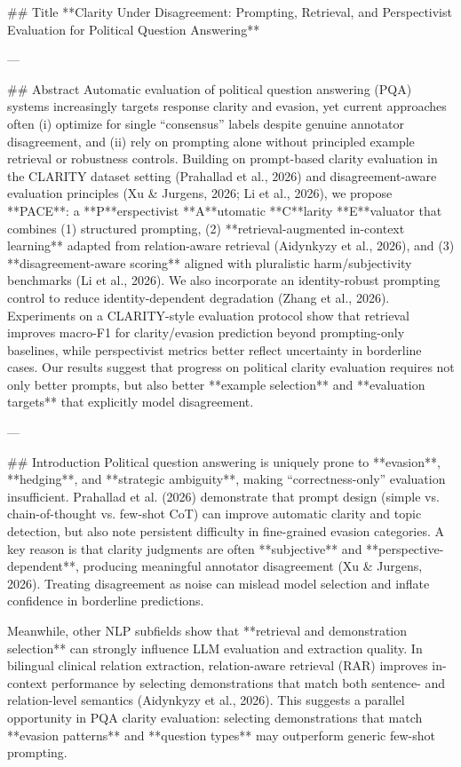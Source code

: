 ## Title  
**Clarity Under Disagreement: Prompting, Retrieval, and Perspectivist Evaluation for Political Question Answering**

---

## Abstract  
Automatic evaluation of political question answering (PQA) systems increasingly targets response clarity and evasion, yet current approaches often (i) optimize for single “consensus” labels despite genuine annotator disagreement, and (ii) rely on prompting alone without principled example retrieval or robustness controls. Building on prompt-based clarity evaluation in the CLARITY dataset setting (Prahallad et al., 2026) and disagreement-aware evaluation principles (Xu & Jurgens, 2026; Li et al., 2026), we propose **PACE**: a **P**erspectivist **A**utomatic **C**larity **E**valuator that combines (1) structured prompting, (2) **retrieval-augmented in-context learning** adapted from relation-aware retrieval (Aidynkyzy et al., 2026), and (3) **disagreement-aware scoring** aligned with pluralistic harm/subjectivity benchmarks (Li et al., 2026). We also incorporate an identity-robust prompting control to reduce identity-dependent degradation (Zhang et al., 2026). Experiments on a CLARITY-style evaluation protocol show that retrieval improves macro-F1 for clarity/evasion prediction beyond prompting-only baselines, while perspectivist metrics better reflect uncertainty in borderline cases. Our results suggest that progress on political clarity evaluation requires not only better prompts, but also better **example selection** and **evaluation targets** that explicitly model disagreement.

---

## Introduction  
Political question answering is uniquely prone to **evasion**, **hedging**, and **strategic ambiguity**, making “correctness-only” evaluation insufficient. Prahallad et al. (2026) demonstrate that prompt design (simple vs. chain-of-thought vs. few-shot CoT) can improve automatic clarity and topic detection, but also note persistent difficulty in fine-grained evasion categories. A key reason is that clarity judgments are often **subjective** and **perspective-dependent**, producing meaningful annotator disagreement (Xu & Jurgens, 2026). Treating disagreement as noise can mislead model selection and inflate confidence in borderline predictions.

Meanwhile, other NLP subfields show that **retrieval and demonstration selection** can strongly influence LLM evaluation and extraction quality. In bilingual clinical relation extraction, relation-aware retrieval (RAR) improves in-context performance by selecting demonstrations that match both sentence- and relation-level semantics (Aidynkyzy et al., 2026). This suggests a parallel opportunity in PQA clarity evaluation: selecting demonstrations that match **evasion patterns** and **question types** may outperform generic few-shot prompting.


